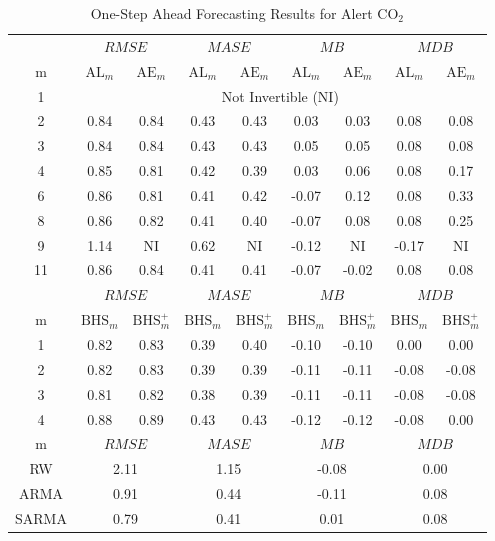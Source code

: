 \begin{table}[htbp]
\footnotesize
\centering
\caption{One-Step Ahead Forecasting Results for Alert $\textrm{CO}_2$}
\begin{tabular}{c|cc|cc|cc|cc}
  \hline
   & \multicolumn{2}{c|}{$RMSE$} & \multicolumn{2}{c|}{$MASE$} &
  \multicolumn{2}{c|}{$MB$} & \multicolumn{2}{c}{$MDB$}\\
   m & $\textrm{AL}_m$ & $\textrm{AE}_m$ &
  $\textrm{AL}_m$ & $\textrm{AE}_m$ &
  $\textrm{AL}_m$ & $\textrm{AE}_m$ &
  $\textrm{AL}_m$ & $\textrm{AE}_m$ \\
  \hline
  1 & \multicolumn{8}{c}{Not Invertible (NI)} \\ 
  2 & 0.84 & 0.84 & 0.43 & 0.43 & 0.03 & 0.03 & 0.08 & 0.08 \\ 
  3 & 0.84 & 0.84 & 0.43 & 0.43 & 0.05 & 0.05 & 0.08 & 0.08 \\ 
  4 & 0.85 & 0.81 & 0.42 & 0.39 & 0.03 & 0.06 & 0.08 & 0.17 \\ 
  6 & 0.86 & 0.81 & 0.41 & 0.42 & -0.07 & 0.12 & 0.08 & 0.33 \\ 
  8 & 0.86 & 0.82 & 0.41 & 0.40 & -0.07 & 0.08 & 0.08 & 0.25 \\ 
  9 & 1.14 & NI & 0.62 & NI & -0.12 & NI & -0.17 & NI \\ 
  11 & 0.86 & 0.84 & 0.41 & 0.41 & -0.07 & -0.02 & 0.08 & 0.08 \\ 
    \hline
  \hline
     & \multicolumn{2}{c|}{$RMSE$} & \multicolumn{2}{c|}{$MASE$} &
  \multicolumn{2}{c|}{$MB$} & \multicolumn{2}{c}{$MDB$}\\
  m & $\textrm{BHS}_m$ & $\textrm{BHS}^+_m$ &
  $\textrm{BHS}_m$ & $\textrm{BHS}^+_m$ &
  $\textrm{BHS}_m$ & $\textrm{BHS}^+_m$ &
  $\textrm{BHS}_m$ & $\textrm{BHS}^+_m$ \\
  \hline
  1 & 0.82 & 0.83 & 0.39 & 0.40 & -0.10 & -0.10 & 0.00 & 0.00 \\ 
  2 & 0.82 & 0.83 & 0.39 & 0.39 & -0.11 & -0.11 & -0.08 & -0.08 \\ 
  3 & 0.81 & 0.82 & 0.38 & 0.39 & -0.11 & -0.11 & -0.08 & -0.08 \\ 
  4 & 0.88 & 0.89 & 0.43 & 0.43 & -0.12 & -0.12 & -0.08 & 0.00 \\ 
  \hline
  \hline
      m & \multicolumn{2}{c|}{$RMSE$} & \multicolumn{2}{c|}{$MASE$} &
  \multicolumn{2}{c|}{$MB$} & \multicolumn{2}{c}{$MDB$}\\
  \hline
    RW &  \multicolumn{2}{c|}{2.11} & \multicolumn{2}{c|}{1.15} &
  \multicolumn{2}{c|}{-0.08} & \multicolumn{2}{c}{0.00}\\
      ARMA &  \multicolumn{2}{c|}{0.91} & \multicolumn{2}{c|}{0.44} &
  \multicolumn{2}{c|}{-0.11} & \multicolumn{2}{c}{0.08}\\
    SARMA &  \multicolumn{2}{c|}{0.79} & \multicolumn{2}{c|}{0.41} &
  \multicolumn{2}{c|}{0.01} & \multicolumn{2}{c}{0.08}\\
   \hline
\end{tabular}
\label{tab:alertselect}
\end{table}

